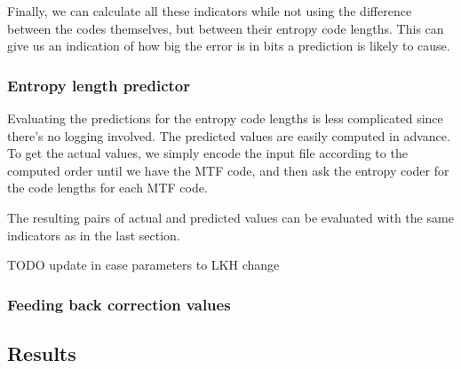 \documentclass[a4paper]{scrreprt}
\begin{document}
Finally, we can calculate all these indicators while not using the difference
between the codes themselves, but between their entropy code lengths. This can
give us an indication of how big the error is in bits a prediction is likely to
cause.

\subsubsection{Entropy length predictor}

Evaluating the predictions for the entropy code lengths is less complicated
since there's no logging involved. The predicted values are easily computed in
advance. To get the actual values, we simply encode the input file according to
the computed order until we have the MTF code, and then ask the entropy coder
for the code lengths for each MTF code.

The resulting pairs of actual and predicted values can be evaluated with the
same indicators as in the last section.


TODO update in case parameters to LKH change
\subsubsection{Feeding back correction values}

\subsection{Results}
\end{document}
